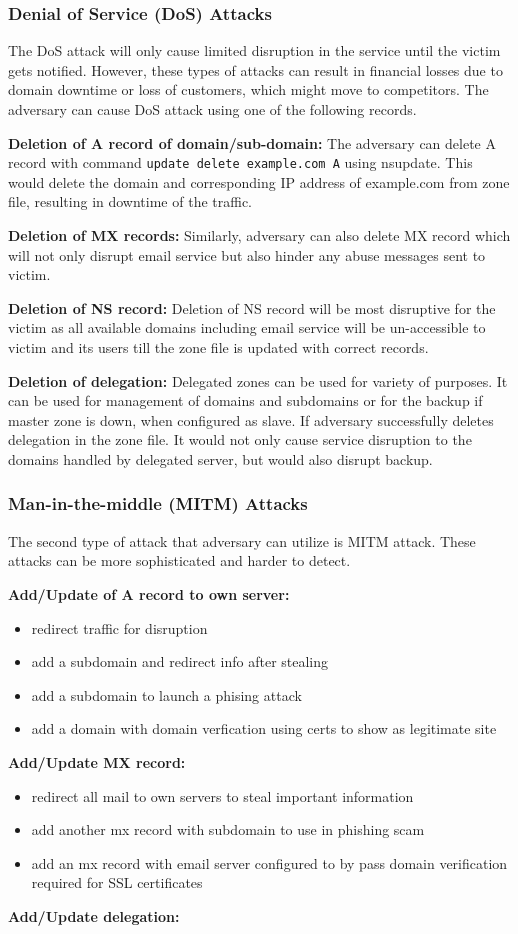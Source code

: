 \subsubsection{Denial of Service (DoS) Attacks} 
The DoS attack will only cause limited disruption in the service until the victim gets notified. However, these types of attacks can result in financial losses due to domain downtime or loss of customers, which might move to competitors. The adversary can cause DoS attack using one of the following records. 

\textbf{Deletion of A record of domain/sub-domain:} The adversary can delete A record with command \texttt{update delete example.com A} using nsupdate. This would delete the domain and corresponding IP address of example.com from zone file, resulting in downtime of the traffic. 

\textbf{Deletion of MX records:} Similarly, adversary can also delete MX record which will not only disrupt email service but also hinder any abuse messages sent to victim.  

\textbf{Deletion of NS record:} Deletion of NS record will be most disruptive for the victim as all available domains including email service will be un-accessible to victim and its users till the zone file is updated with correct records. 

 \textbf{Deletion of delegation:} Delegated zones can be used for variety of purposes. It can be used for management of domains and subdomains or for the backup if master zone is down,  when configured as slave. If adversary successfully deletes delegation in the zone file. It would not only cause service disruption to the  domains handled by delegated server, but would also disrupt backup. 


\subsubsection{Man-in-the-middle (MITM) Attacks}
The second type of attack that adversary can utilize is MITM attack. These attacks can be more sophisticated and harder to detect. 

\textbf{Add/Update of A record to own server:}
\begin{itemize}
\item redirect traffic for disruption
\item add a subdomain and redirect info after stealing 
\item add a subdomain to launch a phising attack 
\item add a domain with domain verfication using certs to show as legitimate site 
\end{itemize}
\textbf{Add/Update MX record:} 
\begin{itemize}
\item redirect all mail to own servers to steal important information 
\item add another mx record with subdomain to use in phishing scam 
\item add an mx record with email server configured to by pass domain verification required for SSL certificates

\end{itemize}

\textbf{Add/Update delegation:}

